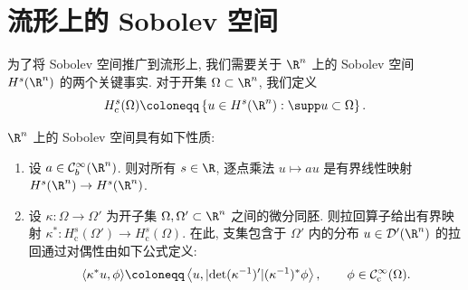 \section{流形上的 Sobolev 空间}\label{sec:5.10}
%

为了将 Sobolev 空间推广到流形上, 我们需要关于 $\R^n$ 上的 Sobolev 空间 $H^s(\R^n)$ 的两个关键事实. 对于开集 $\Omega \subset \R^n$, 我们定义
\begin{equation}\label{eq:5.130}
    H_{\mathrm{c}}^s(\Omega) \defeq \left\{ u \in H^s(\R^n) : \supp u \subset \Omega \right\}.
\end{equation}

\begin{lemma}\label{lem:5.56}
$\R^n$ 上的 Sobolev 空间具有如下性质:
\begin{enumerate}
    \item 设 $a \in \mathcal{C}_b^\infty(\R^n)$. 则对所有 $s \in \R$, 逐点乘法 $u \mapsto a u$ 是有界线性映射 $H^s(\R^n) \to H^s(\R^n)$.
    \item 设 $\kappa \colon \Omega \to \Omega'$ 为开子集 $\Omega, \Omega' \subset \R^n$ 之间的微分同胚. 则拉回算子给出有界映射 $\kappa^* \colon H_{\mathrm{c}}^s(\Omega') \to H_{\mathrm{c}}^s(\Omega)$. 在此, 支集包含于 $\Omega'$ 内的分布 $u \in \mathcal{D}'(\R^n)$ 的拉回通过对偶性由如下公式定义:
    \begin{equation}\label{eq:5.131}
        \langle \kappa^* u, \phi \rangle \defeq \left\langle u, |\!\det(\kappa^{-1})'| (\kappa^{-1})^* \phi \right\rangle, \qquad \phi \in \SmoothComp(\Omega).
    \end{equation}
\end{enumerate}
\end{lemma}

